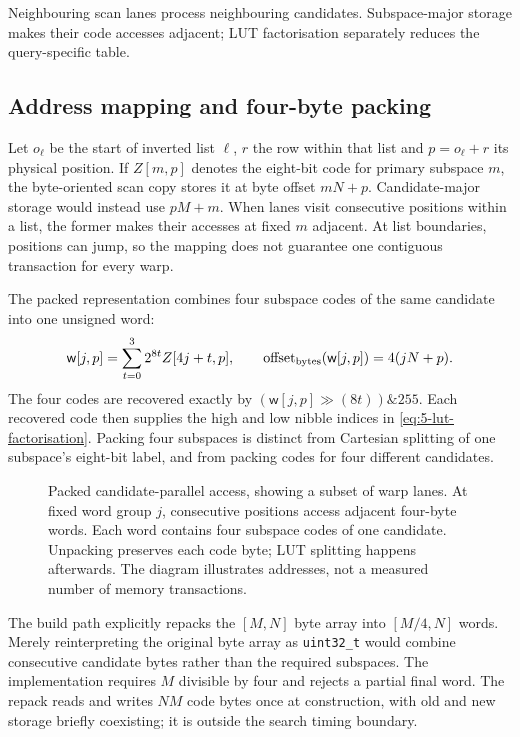 Neighbouring scan lanes process neighbouring candidates. Subspace-major
storage makes their code accesses adjacent; LUT factorisation separately
reduces the query-specific table.

\subsection{Address mapping and four-byte packing}

Let $o_\ell$ be the start of inverted list $\ell$, $r$ the row within
that list and $p=o_\ell+r$ its physical position. If $Z[m,p]$ denotes
the eight-bit code for primary subspace $m$, the byte-oriented scan copy
stores it at byte offset $mN+p$. Candidate-major storage would instead
use $pM+m$. When lanes visit consecutive positions within a list, the
former makes their accesses at fixed $m$ adjacent. At list boundaries,
positions can jump, so the mapping does not guarantee one contiguous
transaction for every warp.

The packed representation combines four subspace codes of the same
candidate into one unsigned word:
\begin{equation}
 \mathsf{w}[j,p]=\sum_{t=0}^{3}2^{8t}Z[4j+t,p],\qquad
 \operatorname{offset}_{\rm bytes}(\mathsf{w}[j,p])=4(jN+p).
 \label{eq:5-packed-layout}
\end{equation}
The four codes are recovered exactly by
$(\mathsf{w}[j,p]\gg(8t))\mathbin{\&}255$. Each recovered code then supplies the
high and low nibble indices in \cref{eq:5-lut-factorisation}. Packing
four subspaces is distinct from Cartesian splitting of one subspace's
eight-bit label, and from packing codes for four different candidates.

\begin{figure}[tbp]
\centering

\caption[Packed candidate-parallel access]{Packed candidate-parallel access, showing a subset of warp lanes.
At fixed word group $j$, consecutive positions access adjacent four-byte
words. Each word contains four subspace codes of one candidate. Unpacking
preserves each code byte; LUT splitting happens afterwards. The diagram
illustrates addresses, not a measured number of memory transactions.}
\label{fig:5-packed-access}
\end{figure}

The build path explicitly repacks the $[M,N]$ byte array into
$[M/4,N]$ words. Merely reinterpreting the original byte array as
\texttt{uint32\_t} would combine consecutive candidate bytes rather
than the required subspaces. The implementation requires $M$ divisible
by four and rejects a partial final word. The repack reads and writes
$NM$ code bytes once at construction, with old and new storage briefly
coexisting; it is outside the search timing boundary.

